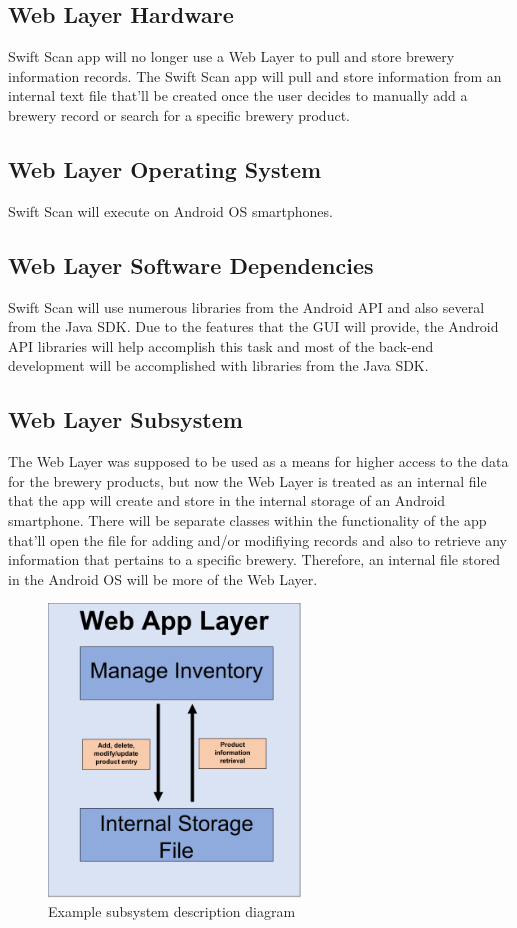 
\subsection{Web Layer Hardware}
Swift Scan app will no longer use a Web Layer to pull and store brewery information records.  The Swift Scan app will pull and store information from an internal text file that'll be created once the user decides to manually add a brewery record or search for a specific brewery product.

\subsection{Web Layer Operating System}
Swift Scan will execute on Android OS smartphones.

\subsection{Web Layer Software Dependencies}
Swift Scan will use numerous libraries from the Android API and also several from the Java SDK.  Due to the features that the GUI will provide, the Android API libraries will help accomplish this task and most of the back-end development will be accomplished with libraries from the Java SDK.

\subsection{Web Layer Subsystem}
The Web Layer was supposed to be used as a means for higher access to the data for the brewery products, but now the Web Layer is treated as an internal file that the app will create and store in the internal storage of an Android smartphone.  There will be separate classes within the functionality of the app that'll open the file for adding and/or modifiying records and also to retrieve any information that pertains to a specific brewery.  Therefore, an internal file stored in the Android OS will be more of the Web Layer.

\begin{figure}[h!]
	\centering
 	\includegraphics[width=0.60\textwidth]{images/x_layer.png}
 \caption{Example subsystem description diagram}
\end{figure}

